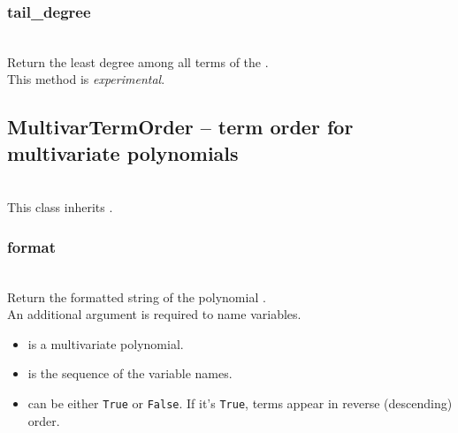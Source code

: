   \subsubsection{tail\_degree}
  \\
  \spacing
  \quad Return the least degree among all terms of the .\\
  \spacing
  \quad This method is {\em experimental}.

  \subsection{MultivarTermOrder -- term order for multivariate polynomials}
  \initialize
  \\
  \spacing
  \quad This class inherits .

  \method
  \subsubsection{format}
  \\
  \spacing
  \quad Return the formatted string of the polynomial .\\
  \spacing
  \quad  An additional argument  is required to name
  variables.\\

  \begin{itemize}
  \item {} is a multivariate polynomial.
  \item {} is the sequence of the variable names.
  \item {} can be either {\tt True} or {\tt False}.
    If it's {\tt True}, terms appear in reverse (descending) order.
  \end{itemize}

